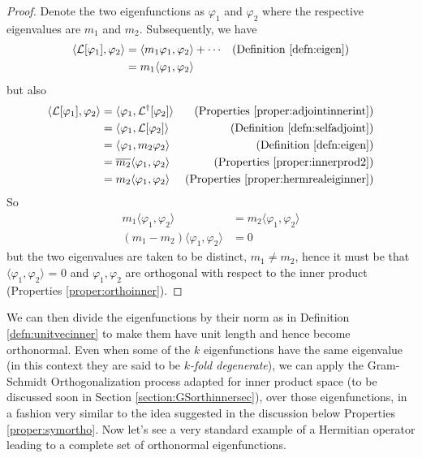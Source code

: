 \begin{proof}
Denote the two eigenfunctions as $\varphi_1$ and $\varphi_2$ where the respective eigenvalues are $m_1$ and $m_2$. Subsequently, we have
\begin{align*}
\langle \mathcal{L}[\varphi_1], \varphi_2 \rangle &= \langle m_1\varphi_1, \varphi_2 \rangle + \cdots & \text{(Definition \ref{defn:eigen})} \\
&= m_1 \langle \varphi_1, \varphi_2 \rangle 
\end{align*}
but also
\begin{align*}
\langle \mathcal{L}[\varphi_1], \varphi_2 \rangle &= \langle \varphi_1, \mathcal{L}^\dag[\varphi_2] \rangle & \text{(Properties \ref{proper:adjointinnerint})} \\
&= \langle \varphi_1, \mathcal{L}[\varphi_2] \rangle & \text{(Definition \ref{defn:selfadjoint})} \\
&= \langle \varphi_1, m_2\varphi_2 \rangle & \text{(Definition \ref{defn:eigen})} \\
&= \overline{m_2} \langle \varphi_1, \varphi_2 \rangle & \text{(Properties \ref{proper:innerprod2})} \\
&= m_2 \langle \varphi_1, \varphi_2 \rangle & \text{(Properties \ref{proper:hermrealeiginner})}
\end{align*}
So
\begin{align*}
m_1 \langle \varphi_1, \varphi_2 \rangle &= m_2 \langle \varphi_1, \varphi_2 \rangle \\
(m_1 - m_2) \langle \varphi_1, \varphi_2 \rangle &= 0
\end{align*}
but the two eigenvalues are taken to be distinct, $m_1 \neq m_2$, hence it must be that $\langle \varphi_1, \varphi_2 \rangle$ = 0 and $\varphi_1, \varphi_2$ are orthogonal with respect to the inner product (Properties \ref{proper:orthoinner}).
\end{proof}
We can then divide the eigenfunctions by their norm as in Definition \ref{defn:unitvecinner} to make them have unit length and hence become orthonormal. Even when some of the $k$ eigenfunctions have the same eigenvalue (in this context they are said to be \textit{$k$-fold degenerate}), we can apply the Gram-Schmidt Orthogonalization process adapted for inner product space (to be discussed soon in Section \ref{section:GSorthinnersec}), over those eigenfunctions, in a fashion very similar to the idea suggested in the discussion below Properties \ref{proper:symortho}. Now let's see a very standard example of a Hermitian operator leading to a complete set of orthonormal eigenfunctions.

